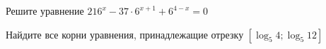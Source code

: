 \begin{ex}
	\begin{condition}
		\begin{enumcols}[label=\asbuk*)]
			\item Решите уравнение \( 216^x - 37\cdot 6^{x+1} +6^{4-x}  = 0 \)
			\item Найдите все корни уравнения, принадлежащие отрезку \( \left[\log_5 4;\log_5 12\right] \)
		\end{enumcols}
	\end{condition}
\end{ex}